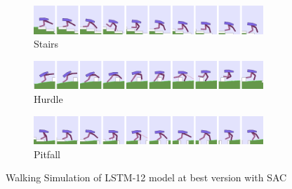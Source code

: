 \documentclass[a4paper, 12pt]{article} %
\begin{document}
\begin{figure}[!ht]
	\centering
	\begin{subfigure}{.95\textwidth}
		\centering
		\includegraphics[width=0.95\textwidth]{figures/bipedal/anim/lstm-12-stairs.png}
		\caption{Stairs}
		\label{fig:anim_lstm_stairs}
	\end{subfigure}
	\begin{subfigure}{.95\textwidth}
		\centering
		\includegraphics[width=0.95\textwidth]{figures/bipedal/anim/lstm-12-hurdle.png}
		\caption{Hurdle}
		\label{fig:anim_lstm_hurdle}
	\end{subfigure}
	\begin{subfigure}{.95\textwidth}
		\centering
		\includegraphics[width=0.95\textwidth]{figures/bipedal/anim/lstm-12-pitfall.png}
		\caption{Pitfall}
		\label{fig:anim_lstm_pitfall}
	\end{subfigure}
	\caption{Walking Simulation of LSTM-12 model at best version with SAC}
	\label{fig:lstm_simulation}
\end{figure}
\end{document}
